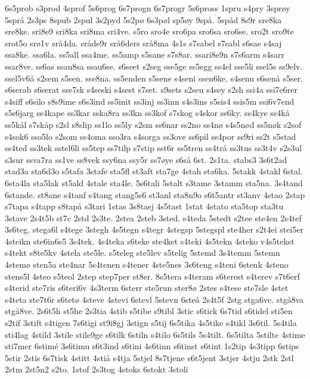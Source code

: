 {6s5prob
s3prod
4sprof
5s6prog
6s7progn
6s7progr
5s6pross
1spru
s4pry
3sprøy
5språ
2s3ps
8spub
2spul
3s2pyd
5s2pø
6s3pøl
sp5øy
9spå.
5spåd
8s9r
sre8ka
sre8ke.
sri8e9
sri8ka
sri8ma
sri4ve.
s5ro
sro4e
sro6pa
sro6sa
sro6se.
sro2t
sro9te
srot5o
srø1v
srå4da.
sråde9r
srå6ders
srå8ma
4s1s
s7sabel
s7sabl
s6sae
s4saj
ssa8ke.
ssa6la.
ss5all
ssa4me.
ss5amp
s5sane
s7s8ar.
ssari8e9n
s7s6arm
s4sarr
ssar8ve.
ss6as
ssau8sa
ssau6se.
s6seet
s2seg
sse5ge
ss5egg
ss4el
sse5li
ssel5s
ss9elv.
ssel5v6å
s2sem
s5sen.
sse8na.
ss5enden
s5sene
s4seni
ssen6ke.
s4senu
s6senå
s5ser.
s6serab
s6serat
sse7sk
s4seski
s4sest
s7set.
s9sets
s2seu
s4sey
s2sh
ssi4a
ssi7e6rer
s4siff
s6silo
s8s9ime
s6s3ind
ss5init
ss3inj
ss3inn
s4s3ins
s5sis4
ssis5m
ssi6v7end
s5s6jarg
ss4kape
ss3kar
sska8ra
ss3kn
ss3kof
s7skog
s4skor
ss6ky.
ss4kye
ss4kå
ss5kål
s7skåp
s2sl
s8slip
ss1lo
ss5ly
s2sm
ss6nar
ss2no
ss4nø
s4s5nød
ss5nøk
s2sof
s4sok6
sso5lo
s2som
ss4oma
sso3ra
s4sorga
ss3ove
ss6pil
ss4por
ss9ri
ss2t
s5stad
ss4ted
ss3tek
sstel6li
ss5tep
ss7tilp
s7stip
sst6r
ss5tren
ss4trå
ss3tus
ss3t4v
s2s3ul
s3sur
ssva7ra
ss1ve
ss8vek
ssy6na
ssy5r
ss7øye
s6så
6st.
2s1ta.
stabs3
3s6t2ad
stad3a
sta6d3o
s5tafa
3stafe
sta5fl
st3aft
sta7ge
4stah
sta6ka.
5stakk
4stakl
6stal.
6sta4la
sta5lak
st5ald
4stale
sta4le.
5s6tali
5stalt
s3tame
3stamm
sta5na.
3s4tand
6stande.
st8ane
s4tanf
s4tang
stang5s6
st3anl
sta8n9o
s6t5antr
st3anv
4stao
2stap
s7tapa
s4tapp
s8tapå
s3tari
1stas
3s8tasj
4s5tast
1stat
4stato
sta5top
sta3tu
3stave
2s4t5b
st7c
2std
2s3te.
2stea
2steb
3sted.
s4teda
5stedt
s2tee
ste4en
2s4tef
3s6teg.
stega6l
s4tege
3stegh
4s5tegn
s4tegr
4stegsp
5stegspl
ste4her
s2t4ei
stei5er
4steikn
ste6in6s5
3s4tek.
4s4teka
s6teke
ste4ket
s4teki
4s5tekn
4steko
v4s5tekst
s4tekt
s8te5kv
4stela
ste5le.
s5teleg
ste5lev
s5telig
5stemd
3s4temm
5stemn
4stemø
sten5a
ste4nar
5s4tenen
s4tener
4ste5nes
3s6teng
s4teni
6stenk
4steno
stens5l
4steo
s5teol
2step
step7per
st8er.
8s5tera
s4teram
s6terest
s4terev
s7t6erf
s4terid
ste7ris
s6teri6v
4s3term
6sterr
ste5run
ster8ø
2stes
s4tese
ste7sle
4stet
s4teta
ste7t6r
s6tetø
4steve
4stevi
6stevl
5stevn
6steå
2s4t5f
2stg
stga6ve.
stgå8va
stgå8ve.
2s6t5h
st5he
2s3tia
4stib
s5tibe
s9tibl
3stic
s6tick
6s7tid
s6tidel
sti5en
s2tif
3stift
s4tigen
7s6tigi
st9i8gj
3stign
s5tij
6s5tika
4s5tike
s4tikl
3s6til.
5s4tila
sti4lag
4stild
3stile
stile9ge
s6tilk
6stiln
s4tilo
6s5tils
5s4tilt.
6s5tilta
5stilte
4stime
sti7mer
6stimé
3s6timu
s6t3ind
s6tini
4s6tinn
s6tinst
s6tint
1s2tip
4s3tipp
6stips
5stir
2stis
6s7tisk
4stitt
4stiå
s4tja
5stjel
8s7tjene
s6t5jent
3stjer
4stju
2stk
2stl
2stm
2st5n2
s2to.
1stof
2s3tog
4stoks
6stokt
3stoli
}
